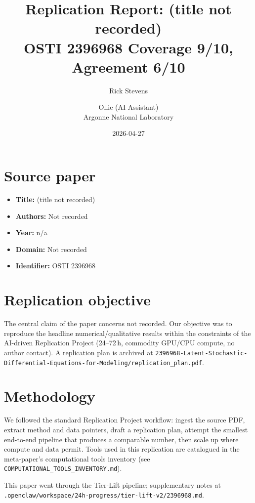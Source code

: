 \documentclass[11pt]{article}
\title{Replication Report: (title not recorded)\\[2pt]\large OSTI 2396968 \textbar{} Coverage 9/10, Agreement 6/10}
\author{Rick Stevens \and Ollie (AI Assistant)\\\small Argonne National Laboratory}
\date{2026-04-27}
\begin{document}
\maketitle

\section{Source paper}
\begin{itemize}
\item \textbf{Title:} (title not recorded)
\item \textbf{Authors:} Not recorded
\item \textbf{Year:} n/a
\item \textbf{Domain:} Not recorded
\item \textbf{Identifier:} OSTI 2396968
\end{itemize}


\section{Replication objective}
The central claim of the paper concerns not recorded. Our objective was to reproduce the headline numerical/qualitative results within the constraints of the AI-driven Replication Project (24--72\,h, commodity GPU/CPU compute, no author contact). A replication plan is archived at \texttt{2396968-Latent-Stochastic-Differential-Equations-for-Modeling/replication\_plan.pdf}.

\section{Methodology}
We followed the standard Replication Project workflow: ingest the source PDF, extract method and data pointers, draft a replication plan, attempt the smallest end-to-end pipeline that produces a comparable number, then scale up where compute and data permit. Tools used in this replication are catalogued in the meta-paper's computational tools inventory (see \texttt{COMPUTATIONAL\_TOOLS\_INVENTORY.md}).

This paper went through the Tier-Lift pipeline; supplementary notes at \texttt{.openclaw/workspace/24h-progress/tier-lift-v2/2396968.md}.
\end{document}
